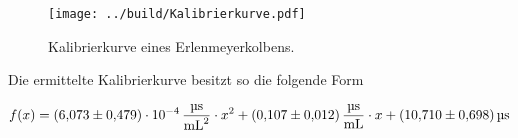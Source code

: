 \begin{figure}[H]
    \centering
    \texttt{[image: ../build/Kalibrierkurve.pdf]}
    \caption{Kalibrierkurve eines Erlenmeyerkolbens.}
    \label{fig:Kalibrierkurve}
\end{figure}

\noindent Die ermittelte Kalibrierkurve besitzt so die folgende Form

\begin{equation*}
    f(x)= \qty{6.073\pm0.479e-4}{\micro \second \per \milli \liter \squared } \cdot x^2   +  
          \qty{0.107\pm0.012}{\micro \second \per \milli \liter}              \cdot x     +
          \qty{10.71\pm0.698}{\micro \second }
\end{equation*}


%
